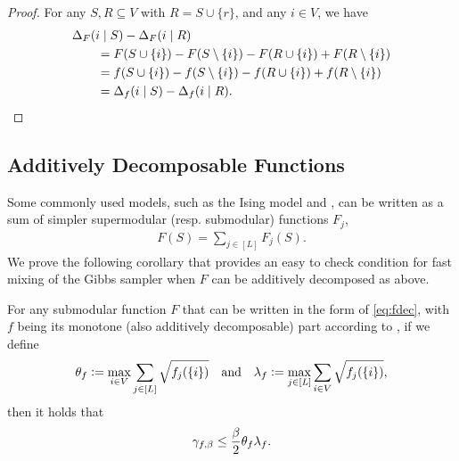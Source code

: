 \begin{proof}
  For any $S, R \subseteq V$ with $R = S \cup \{r\}$, and any $i \in V$, we have
  \begin{align*}
    &\Delta_F(i\mid S) - \Delta_F(i\mid R)\\
    &\quad\quad= F(S \cup \{i\}) - F(S \setminus \{i\}) - F(R \cup \{i\}) + F(R \setminus \{i\})\\
    &\quad\quad= f(S \cup \{i\}) - f(S \setminus \{i\}) - f(R \cup \{i\}) + f(R \setminus \{i\})\\
    &\quad\quad= \Delta_f(i\mid S) - \Delta_f(i\mid R).
  \end{align*}
\end{proof}

\subsection{Additively Decomposable Functions}
Some commonly used models, such as the Ising model and \flid{}, can be written as a sum of simpler supermodular (resp. submodular) functions $F_{j}$,
\begin{align} \label{eq:fdec}
F(S) = \sum_{j \in [L]} F_{j}(S).
\end{align}
We prove the following corollary that provides an easy to check condition for fast mixing of the Gibbs sampler when $F$ can be additively decomposed as above.
\begin{cor} \label{cor:fast}
  For any submodular function $F$ that can be written in the form of \eqref{eq:fdec}, with $f$ being its monotone (also additively decomposable) part according to , if we define
  \begin{align*}
  	\theta_f \vcentcolon= \max_{i \in V} \sum_{j\in [L]} \sqrt{f_{j}(\{i\})} \hspace{1em}\textrm{and}\hspace{1em} \lambda_f \vcentcolon= \max_{j\in [L]} \sum_{i \in V} \sqrt{f_{j}(\{i\})},
  \end{align*}
  then it holds that
  \begin{align*}
  	\gamma_{f,\beta} \leq \frac{\beta}{2} \theta_f \lambda_f.
  \end{align*}
\end{cor}

